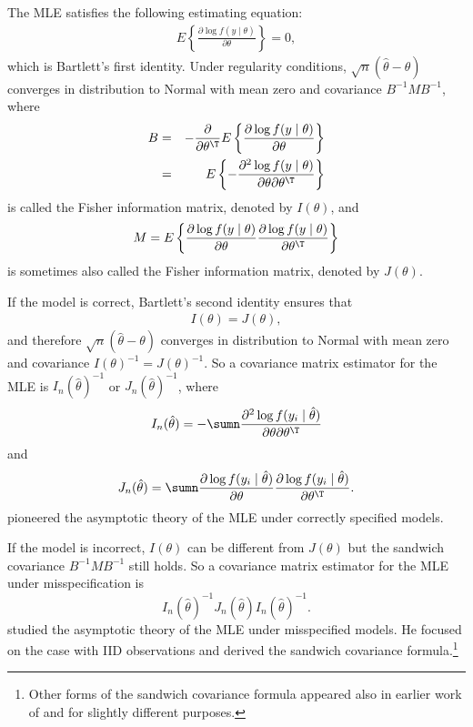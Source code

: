  
The MLE satisfies the following estimating equation:
\begin{eqnarray}
E\left\{  \frac{\partial \log f(y\mid \theta)}{ \partial \theta}   \right\} = 0,
\label{eq::bartlett-vector1}
\end{eqnarray}
which is Bartlett's first identity. 
Under regularity conditions, $\sqrt{n} (\hat{\theta} - \theta)$ converges in distribution to Normal with mean zero and covariance $B^{-1} M B^{-1}$, where
\begin{eqnarray*}
B 
&=& - \frac{\partial }{\partial \theta^{\T}} E\left\{  \frac{\partial \log f(y\mid \theta)}{ \partial \theta}   \right\} \\
&=&
E\left\{ -  \frac{\partial^2 \log f(y\mid \theta)}{ \partial \theta  \partial \theta^{\T} }   \right\} 
\end{eqnarray*}
is called the Fisher information matrix, denoted by $I(\theta)$,
and
$$
M = E\left\{  \frac{\partial \log f(y\mid \theta)}{ \partial \theta}  \frac{\partial \log f(y\mid \theta)}{ \partial \theta^{\T}}   \right\}
$$
is sometimes also called the Fisher information matrix, denoted by  $J(\theta)$.


If the model is correct,
Bartlett's second identity ensures that 
\begin{eqnarray}
I(\theta)=J(\theta),
\label{eq::bartlett-vector2}
\end{eqnarray}
and therefore  $\sqrt{n} (\hat{\theta} - \theta)$ converges in distribution to Normal with mean zero and covariance $I(\theta)^{-1} = J(\theta)^{-1}$. So a covariance matrix estimator for the MLE is $I_n(\hat{\theta})^{-1}$ or $J_n(\hat{\theta}) ^{-1}$, where 
$$
I_n(\hat{\theta}) =  - \sumn   \frac{\partial^2 \log f(y_i\mid \hat{\theta} )}{ \partial \theta \partial \theta^{\T} }  
$$   
and
$$
J_n(\hat{\theta}) = \sumn \frac{\partial \log f(y_i \mid \hat{\theta})}{ \partial \theta}  \frac{\partial \log f(y_i \mid \hat{\theta})}{ \partial \theta^{\T}}. 
$$
\citet{fisher1925theory} pioneered the asymptotic theory of the MLE under correctly specified models. 

If the model is incorrect, $I(\theta)$ can be different from $J(\theta)$ but the sandwich covariance $B^{-1} M B^{-1}$ still holds. So a covariance matrix estimator for the MLE under misspecification is 
$$
I_n(\hat{\theta})^{-1} J_n(\hat{\theta}) I_n(\hat{\theta})^{-1}.
$$
\citet{huber::1967} studied the asymptotic theory of the MLE under  misspecified models. He focused on the case with IID observations and derived the sandwich covariance formula.\footnote{Other forms of the sandwich covariance formula appeared also in earlier work of \citet{godambe1960optimum} and \citet{cox1961tests} for slightly different purposes.
}  


